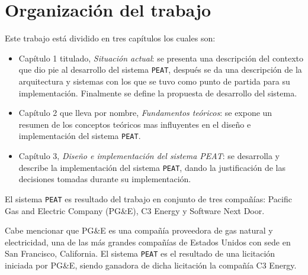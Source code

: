 \section*{Organización del trabajo}

Este trabajo está dividido en tres capítulos los cuales son:
\begin{itemize}
\item Capítulo 1 titulado, \textit{Situación actual}: se presenta una descripción
  del contexto que dio pie al desarrollo del sistema \texttt{PEAT}, después se da una
  descripción de la arquitectura y sistemas con los que se tuvo como punto de
  partida para su implementación. Finalmente se define la propuesta de desarrollo
  del sistema.
\item Capítulo 2 que lleva por nombre, \textit{Fundamentos teóricos}: se expone un
  resumen de los conceptos teóricos mas influyentes en el diseño e implementación del
  sistema \texttt{PEAT}.
\item Capítulo 3, \textit{Diseño e implementación del sistema PEAT}: se desarrolla y
  describe la implementación del sistema \texttt{PEAT}, dando la justificación
  de las decisiones tomadas durante su implementación.
\end{itemize}

El sistema \texttt{PEAT} es resultado del trabajo en conjunto de tres compañías:
Pacific Gas and Electric Company (PG\&E), C3 Energy y Software Next Door.

Cabe mencionar que PG\&E es una compañía proveedora de gas natural y electricidad, una de las
más grandes compañías de Estados Unidos con sede en San Francisco, California.
El sistema \texttt{PEAT} es el resultado de una licitación iniciada por PG\&E,
siendo ganadora de dicha licitación la compañía C3 Energy.
